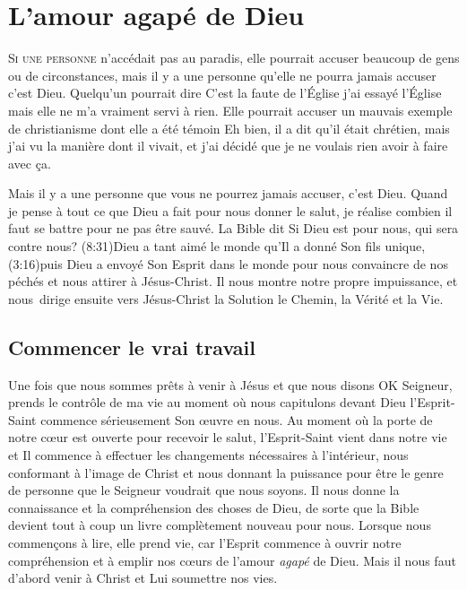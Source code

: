 \chapter{L'amour agap\'e de Dieu}

\lettrine{S}{i une personne} n'accédait pas au paradis,
 elle pourrait accuser beaucoup de gens
 ou de circonstances, mais il y a une personne
 qu'elle ne pourra jamais accuser\frcolon{} c'est Dieu.
 Quelqu'un pourrait dire\frcolon{}
 \Og C'est la faute de l'Église\frcolon{} j'ai essayé l'Église mais
 elle ne m'a vraiment servi à rien. \Fg{}
 Elle pourrait accuser un mauvais exemple de christianisme
 dont elle a été témoin\frcolon{}
 \Og Eh bien, il a dit qu'il était chrétien, mais j'ai vu la manière
 dont il vivait, et j'ai décidé que je ne voulais rien avoir à faire
 avec ça. \Fg{}

Mais il y a une personne que vous ne pourrez jamais accuser, c'est Dieu.
 Quand je pense à tout ce que Dieu a fait pour nous donner le salut,
 je réalise combien il faut se battre pour ne pas être sauvé.
 La Bible dit\frcolon{}
 \Og Si Dieu est pour nous, qui sera contre nous? \Fg{}
 (8:31)Dieu a tant aimé le monde qu'Il a donné
 Son fils unique, (3:16)puis Dieu a envoyé Son Esprit
 dans le monde pour nous convaincre
 de nos péchés et nous attirer à Jésus-Christ.
 Il nous montre notre propre impuissance, et nous~dirige ensuite
 vers Jésus-Christ la Solution \ocadr le Chemin, la Vérité et la Vie.

\section{Commencer le vrai travail}

Une fois que nous sommes prêts à venir à Jésus
 et que nous disons\frcolon{}
 \Og OK Seigneur, prends le contrôle de ma vie \Fg{}
 \ocadr au moment où nous capitulons devant Dieu \fcadr
 l'Esprit-Saint commence sérieusement Son œuvre en nous.
 Au moment où la porte de notre cœur est ouverte pour recevoir le salut,
 l'Esprit-Saint vient dans notre vie et Il commence à effectuer
 les changements nécessaires à l'intérieur, nous conformant
 à l'image de Christ et nous donnant la puissance pour être
 le genre de personne que le Seigneur voudrait que nous soyons.
 Il nous donne la connaissance et la compréhension des choses de Dieu,
 de sorte que la Bible devient tout à coup un livre complètement
 nouveau pour nous. Lorsque nous commençons à lire,
 elle prend vie, car l'Esprit commence à ouvrir notre compréhension
 et à emplir nos cœurs de l'amour \emph{agapé} de Dieu.
 Mais il nous faut d'abord venir à Christ
 et Lui soumettre nos vies.

